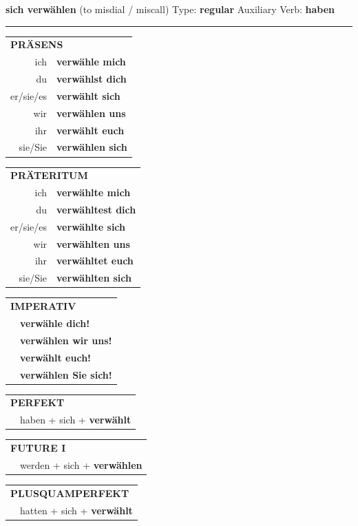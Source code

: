 \documentclass[10pt,a4paper]{revtex4-2}
\begin{document}
\begin{verbbox}
{\Large \bf sich verwählen} (to misdial / miscall) \hfill Type: \textbf{regular} \hfill Auxiliary Verb: \textbf{haben}

\vspace{5pt}
\hrule
\vspace{5pt}

\begin{tabular}{rl}
\multicolumn{2}{l}{\textbf{PRÄSENS}}\\
ich & \textbf{verwähle mich}\\
du & \textbf{verwählst dich}\\
er/sie/es & \textbf{verwählt sich}\\
wir & \textbf{verwählen uns}\\
ihr & \textbf{verwählt euch}\\
sie/Sie & \textbf{verwählen sich}\\
\end{tabular}
\hfill
\begin{tabular}{rl}
\multicolumn{2}{l}{\textbf{PRÄTERITUM}}\\
ich & \textbf{verwählte mich}\\
du & \textbf{verwähltest dich}\\
er/sie/es & \textbf{verwählte sich}\\
wir & \textbf{verwählten uns}\\
ihr & \textbf{verwähltet euch}\\
sie/Sie & \textbf{verwählten sich}\\
\end{tabular}
\hfill
\begin{tabular}{rl}
\multicolumn{2}{l}{\textbf{IMPERATIV}}\\
& \textbf{verwähle dich!}\\
& \textbf{verwählen wir uns!}\\
& \textbf{verwählt euch!}\\
& \textbf{verwählen Sie sich!}\\
\end{tabular}

\vspace{10pt}

\begin{tabular}{rl}
\multicolumn{2}{l}{\textbf{PERFEKT}}\\
& haben + sich + \textbf{verwählt}\\
\end{tabular}
\hfill
\begin{tabular}{rl}
\multicolumn{2}{l}{\textbf{FUTURE I}}\\
& werden + sich + \textbf{verwählen}\\
\end{tabular}
\hfill
\begin{tabular}{rl}
\multicolumn{2}{l}{\textbf{PLUSQUAMPERFEKT}}\\
& hatten + sich + \textbf{verwählt}\\
\end{tabular}


\end{verbbox}
\end{document}
